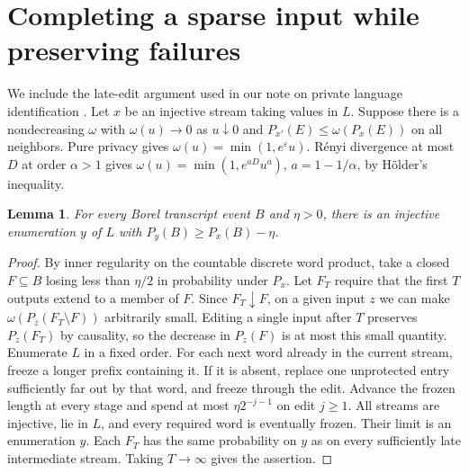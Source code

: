 \documentclass[11pt]{article}
\newtheorem{lemma}[theorem]{Lemma}
\begin{document}
\section{Completing a sparse input while preserving failures}
We include the late-edit argument used in our note on private language identification \cite{li}. Let $x$ be an injective stream taking values in $L$. Suppose there is a nondecreasing $\omega$ with $\omega(u)\to0$ as $u\downarrow0$ and $P_{x'}(E)\le\omega(P_x(E))$ on all neighbors. Pure privacy gives $\omega(u)=\min(1,e^\varepsilon u)$. R\'enyi divergence at most $D$ at order $\alpha>1$ gives $\omega(u)=\min(1,e^{aD}u^a)$, $a=1-1/\alpha$, by H\"older's inequality.
\begin{lemma}\label{extend}
For every Borel transcript event $B$ and $\eta>0$, there is an injective enumeration $y$ of $L$ with $P_y(B)\ge P_x(B)-\eta$.
\end{lemma}
\begin{proof}
By inner regularity on the countable discrete word product, take a closed $F\subseteq B$ losing less than $\eta/2$ in probability under $P_x$. Let $F_T$ require that the first $T$ outputs extend to a member of $F$. Since $F_T\downarrow F$, on a given input $z$ we can make $\omega(P_z(F_T\setminus F))$ arbitrarily small. Editing a single input after $T$ preserves $P_z(F_T)$ by causality, so the decrease in $P_z(F)$ is at most this small quantity. Enumerate $L$ in a fixed order. For each next word already in the current stream, freeze a longer prefix containing it. If it is absent, replace one unprotected entry sufficiently far out by that word, and freeze through the edit. Advance the frozen length at every stage and spend at most $\eta 2^{-j-1}$ on edit $j\ge1$. All streams are injective, lie in $L$, and every required word is eventually frozen. Their limit is an enumeration $y$. Each $F_T$ has the same probability on $y$ as on every sufficiently late intermediate stream. Taking $T\to\infty$ gives the assertion.
\end{proof}
\end{document}
